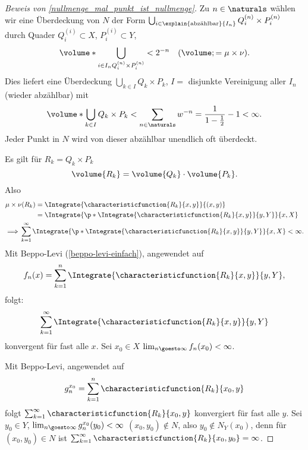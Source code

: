 \begin{proof}[Beweis von \ref{nullmenge_mal_punkt_ist_nullmenge}]
  Zu \( n\in \naturals \) wählen wir eine Überdeckung von \( N \) der Form \( \bigcup_{i\in \explain{\text{abzählbar}}{I_n}}Q_i^{(n)}\times P_i^{(n)} \) durch Quader \( Q_i^{(i)}\subset X \), \( P_i^{(i)}\subset Y \),
  \begin{equation*}
    \volume*{\bigcup_{i\in I_n Q_i^{(n)}\times P_i^{(n)}}}<2^{-n}\quad (\volume;=\mu\times \nu).
  \end{equation*}
  Dies liefert eine Überdeckung \( \bigcup_{k\in I}Q_k\times P_k \), \( I =  \) disjunkte Vereinigung aller \( I_n \) (wieder abzählbar) mit 
  \begin{equation*}
    \volume*{\bigcup_{k\in I}Q_k\times P_k}<\sum_{n\in \naturals} w^{-n}=\frac{1}{1-\frac{1}{2}}-1<\infty.
  \end{equation*}
  Jeder Punkt in \( N \) wird von dieser abzählbar unendlich oft überdeckt.

  Es gilt für \( R_k=Q_k\times P_k \)
  \begin{equation*}
    \volume{R_k}=\volume{Q_k}\cdot \volume{P_k}.
  \end{equation*}
  Also
  \begin{align*}
    \mu\times \nu(R_k)&=\Integrate{\characteristicfunction{R_k}{x,y}}{{(x,y)}}\\
    &=\Integrate{\p*{\Integrate{\characteristicfunction{R_k}{x,y}}{y,Y}}}{x,X}\\
    \implies \span \sum_{k=1}^{\infty}\Integrate{\p*{\Integrate{\characteristicfunction{R_k}{x,y}}{y,Y}}}{x,X}<\infty.
  \end{align*}
  Mit Beppo-Levi (\ref{beppo-levi-einfach}), angewendet auf
  \begin{equation*}
    f_n(x)=\sum_{k=1}^{n}\Integrate{\characteristicfunction{R_k}{x,y}}{y,Y},
  \end{equation*}
  folgt:
  \begin{equation}
    \sum_{k=1}^{\infty}\Integrate{\characteristicfunction{R_k}{x,y}}{y,Y} 
  \end{equation}
  konvergent für fast alle \( x \). Sei \( x_0\in X \) \sd \( \lim_{n \goesto \infty}f_n(x_0)<\infty \).

  Mit Beppo-Levi, angewendet auf
  \begin{equation*}
    g_n^{x_0}=\sum_{k=1}^{n}\characteristicfunction{R_k}{x_0,y}
  \end{equation*}
  folgt \( \sum_{k=1}^{\infty}\characteristicfunction{R_k}{x_0,y} \)
  konvergiert für fast alle \( y \).
  Sei \( y_0\in Y \), \sd  \( \lim_{n \goesto \infty}g_n^{x_0}(y_0)<\infty \) 
  \timplies \( (x_0,y_0)\not\in N \), 
  also \( y_0\not\in N_Y(x_0) \), 
  denn für \( (x_0,y_0)\in N \) ist \( \sum_{k=1}^{\infty}\characteristicfunction{R_k}{x_0,y_0}=\infty \).
\end{proof}
